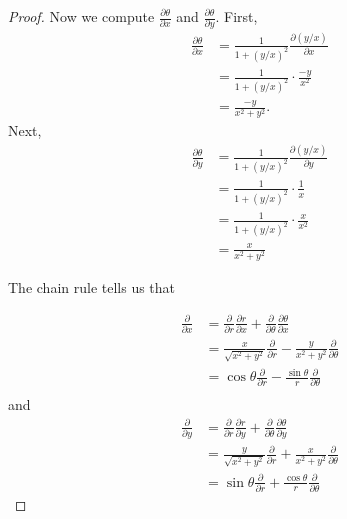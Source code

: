 \documentclass{article}
\begin{document}
\begin{enumerate}
\begin{proof}
		Now we compute $\frac{\partial \theta}{\partial x}$ and $\frac{\partial \theta}{ \partial y}$.
		First,
		\begin{align*}
			\frac{\partial \theta}{\partial x} &= \frac{1}{1+(y/x)^2}\frac{\partial (y/x)}{\partial x} \\
			&=\frac{1}{1+(y/x)^2} \cdot \frac{-y}{x^2}\\
			&=\frac{-y}{x^2+y^2}.
		\end{align*}
		Next,
		\begin{align*}
			\frac{\partial \theta}{\partial y} &= \frac{1}{1+(y/x)^2}\frac{\partial (y/x)}{\partial y} \\
			&=\frac{1}{1+(y/x)^2} \cdot \frac{1}{x}\\
			&=\frac{1}{1+(y/x)^2} \cdot \frac{x}{x^2}\\
			&=\frac{x}{x^2+y^2} 		
		\end{align*}

		The chain rule tells us that
		
		\begin{align*}
			 \frac{\partial}{\partial x} &= \frac{\partial }{\partial r} \frac{\partial r}{\partial x} + \frac{\partial }{\partial \theta} \frac{\partial \theta}{\partial x}  \\
			 &= \frac{x}{\sqrt{x^2+y^2}} \frac{\partial }{\partial r}  - \frac{y}{x^2+y^2}\frac{\partial }{\partial \theta}\\
			 &= \cos \theta  \frac{\partial }{\partial r}  - \frac{\sin \theta}{r}\frac{\partial }{\partial \theta}\\
		\end{align*}
		and
		\begin{align*}
			 \frac{\partial}{\partial y} &= \frac{\partial }{\partial r} \frac{\partial r}{\partial y} + \frac{\partial }{\partial \theta} \frac{\partial \theta}{\partial y} \\
			 &=  \frac{y}{\sqrt{x^2+y^2}}\frac{\partial }{\partial r}  + \frac{x}{x^2+y^2}\frac{\partial }{\partial \theta}\\
			 &= \sin \theta \frac{\partial}{\partial r} + \frac{\cos \theta}{r} \frac{\partial}{\partial \theta}
		\end{align*}
		

\end{proof}
\end{enumerate}
\end{document}
